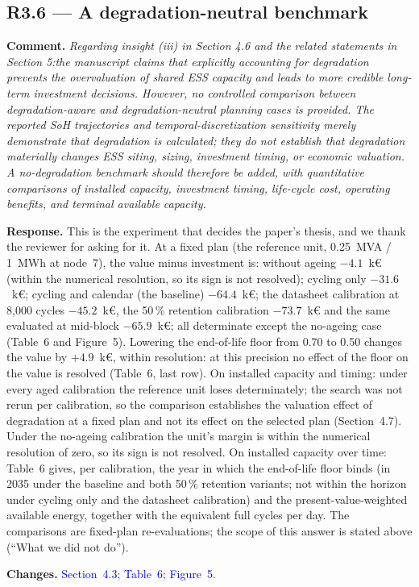 \documentclass[11pt]{article}
\newcommand{\rcomment}[1]{\par\medskip\noindent\textbf{Comment.} \textit{#1}\par\smallskip}
\newcommand{\rresponse}[1]{\noindent\textbf{Response.} #1\par\smallskip}
\newcommand{\rchanges}[1]{\noindent\textbf{Changes.} \textcolor{blue}{#1}\par\medskip}
\begin{document}
\subsection*{R3.6 --- A degradation-neutral benchmark}
\rcomment{
Regarding insight (iii) in Section 4.6 and the related statements in Section 5:the manuscript claims that explicitly accounting for degradation prevents the overvaluation of shared ESS capacity and leads to more credible long-term investment decisions. However, no controlled comparison between degradation-aware and degradation-neutral planning cases is provided. The reported SoH trajectories and temporal-discretization sensitivity merely demonstrate that degradation is calculated; they do not establish that degradation materially changes ESS siting, sizing, investment timing, or economic valuation. A no-degradation benchmark should therefore be added, with quantitative comparisons of installed capacity, investment timing, life-cycle cost, operating benefits, and terminal available capacity.
}
\rresponse{This is the experiment that decides the paper's thesis, and we thank the reviewer for asking for it. At a fixed plan (the reference unit, 0.25~MVA / 1~MWh at node~7), the value minus investment is: without ageing $-4.1$~k\euro{} (within the numerical resolution, so its sign is not resolved); cycling only $-31.6$~k\euro{}; cycling and calendar (the baseline) $-64.4$~k\euro{};  the datasheet calibration at 8,000 cycles $-45.2$~k\euro{}, the 50\,\% retention calibration $-73.7$~k\euro{} and the same evaluated at mid-block $-65.9$~k\euro{}; all determinate except the no-ageing case (Table~6 and Figure~5).
Lowering the end-of-life floor from 0.70 to 0.50 changes the value by $+4.9$~k\euro{}, within resolution: at this precision no effect of the floor on the value is resolved (Table~6, last row). On installed capacity and timing: under every aged calibration the reference unit loses determinately; the search was not rerun per calibration, so the comparison establishes the valuation effect of degradation at a fixed plan and not its effect on the selected plan (Section~4.7). Under the no-ageing calibration the unit's margin is within the numerical resolution of zero, so its sign is not resolved. On installed capacity over time: Table~6 gives, per calibration, the year in which the end-of-life floor binds (in 2035 under the baseline and both 50\,\% retention variants; not within the horizon under cycling only and the datasheet calibration) and the present-value-weighted available energy, together with the equivalent full cycles per day. The comparisons are fixed-plan re-evaluations; the scope of this answer is stated above (``What we did not do'').}
\rchanges{Section~4.3; Table~6; Figure~5.}
\end{document}
